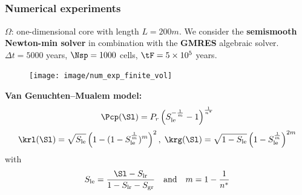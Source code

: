 \documentclass[10 pt]{beamer}
\begin{document}
\subsection{}
\begin{frame}
\frametitle{Numerical experiments}
%
$\Omega$:  one-dimensional core with length $L = 200 m$. We consider the \textbf{semismooth Newton-min solver} in combination with the \textbf{GMRES} algebraic solver.\\
$\Delta t = 5000$ years, $\Nsp = 1000$ cells, $\tF = 5 \times 10^{5}$ years.
\begin{figure}
\texttt{[image: image/num\_exp\_finite\_vol]}
\end{figure}
\textcolor{cadmiumgreen}{\textbf{Van Genuchten--Mualem model:}}
\begin{equation*}
\Pcp(\Sl)=P_r\left(S_{\mathrm{le}}^{-\frac{1}{m}}-1\right)^{\frac{1}{n^{*}}}
\end{equation*}
\begin{equation*}
\krl(\Sl)=\sqrt{S_{\mathrm{le}}} \left(1 - (1-S_{\mathrm{le}}^{\frac{1}{m}})^m  \right)^2, \; \krg(\Sl)=\sqrt{1 - S_{\mathrm{le}}} \left(1 - S_{\mathrm{le}}^{\frac{1}{m}} \right)^{2m}
\end{equation*}    
with 
\begin{equation*}
S_{\mathrm{le}}=\frac{\Sl-S_{\mathrm{lr}}}{1-S_{\mathrm{lr}}-S_{\mathrm{gr}}} \quad \mbox{and} \quad m=1-\frac{1}{n^{*}}
\end{equation*}
\end{frame}
\end{document}
